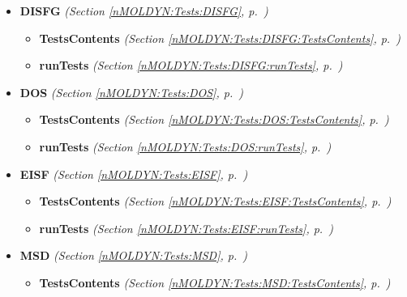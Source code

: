 \begin{itemize}
\begin{itemize}
\begin{itemize}
      \end{itemize}
    \item \textbf{DISFG}
  \textit{(Section \ref{nMOLDYN:Tests:DISFG}, p.~\pageref{nMOLDYN:Tests:DISFG})}

      \begin{itemize}
    \setlength{\parskip}{0ex}
        \item \textbf{TestsContents}
  \textit{(Section \ref{nMOLDYN:Tests:DISFG:TestsContents}, p.~\pageref{nMOLDYN:Tests:DISFG:TestsContents})}

        \item \textbf{runTests}
  \textit{(Section \ref{nMOLDYN:Tests:DISFG:runTests}, p.~\pageref{nMOLDYN:Tests:DISFG:runTests})}

      \end{itemize}
    \item \textbf{DOS}
  \textit{(Section \ref{nMOLDYN:Tests:DOS}, p.~\pageref{nMOLDYN:Tests:DOS})}

      \begin{itemize}
    \setlength{\parskip}{0ex}
        \item \textbf{TestsContents}
  \textit{(Section \ref{nMOLDYN:Tests:DOS:TestsContents}, p.~\pageref{nMOLDYN:Tests:DOS:TestsContents})}

        \item \textbf{runTests}
  \textit{(Section \ref{nMOLDYN:Tests:DOS:runTests}, p.~\pageref{nMOLDYN:Tests:DOS:runTests})}

      \end{itemize}
    \item \textbf{EISF}
  \textit{(Section \ref{nMOLDYN:Tests:EISF}, p.~\pageref{nMOLDYN:Tests:EISF})}

      \begin{itemize}
    \setlength{\parskip}{0ex}
        \item \textbf{TestsContents}
  \textit{(Section \ref{nMOLDYN:Tests:EISF:TestsContents}, p.~\pageref{nMOLDYN:Tests:EISF:TestsContents})}

        \item \textbf{runTests}
  \textit{(Section \ref{nMOLDYN:Tests:EISF:runTests}, p.~\pageref{nMOLDYN:Tests:EISF:runTests})}

      \end{itemize}
    \item \textbf{MSD}
  \textit{(Section \ref{nMOLDYN:Tests:MSD}, p.~\pageref{nMOLDYN:Tests:MSD})}

      \begin{itemize}
    \setlength{\parskip}{0ex}
        \item \textbf{TestsContents}
  \textit{(Section \ref{nMOLDYN:Tests:MSD:TestsContents}, p.~\pageref{nMOLDYN:Tests:MSD:TestsContents})}


\end{itemize}
\end{itemize}
\end{itemize}
